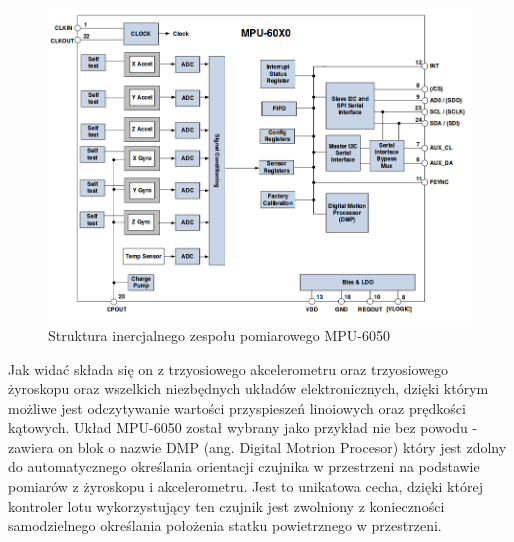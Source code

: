 \begin{figure}[H]
	\centering
	\includegraphics[scale=0.5]{Pictures/IMU.png}
        \caption[Struktura inercjalnego zespołu pomiarowego]{Struktura inercjalnego zespołu pomiarowego MPU-6050}
        \label{fig:IMU}
\end{figure}

Jak widać składa się on z trzyosiowego akcelerometru oraz trzyosiowego żyroskopu oraz wszelkich niezbędnych układów elektronicznych, dzięki którym możliwe jest odczytywanie wartości przyspieszeń linoiowych oraz prędkości kątowych. Układ MPU-6050 został wybrany jako przykład nie bez powodu - zawiera on blok o nazwie DMP (ang. Digital Motrion Procesor) który jest zdolny do automatycznego określania orientacji czujnika w przestrzeni na podstawie pomiarów z żyroskopu i akcelerometru. Jest to unikatowa cecha, dzięki której kontroler lotu wykorzystujący ten czujnik jest zwolniony z konieczności samodzielnego określania  położenia statku powietrznego w przestrzeni. 
